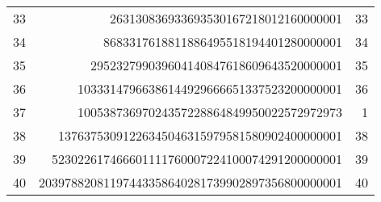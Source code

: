 \documentclass[12pt]{article}
\begin{document}
\begin{tabular}{|r|r|r|}
33 & 263130836933693530167218012160000001 & 33 \\
34 & 8683317618811886495518194401280000001 & 34 \\
35 & 295232799039604140847618609643520000001 & 35 \\
36 & 10333147966386144929666651337523200000001 & 36 \\
37 & 10053873697024357228864849950022572972973 & 1 \\
38 & 13763753091226345046315979581580902400000001 & 38 \\
39 & 523022617466601111760007224100074291200000001 & 39 \\
40 & 20397882081197443358640281739902897356800000001 & 40 \\
\end{tabular}
\end{document}
